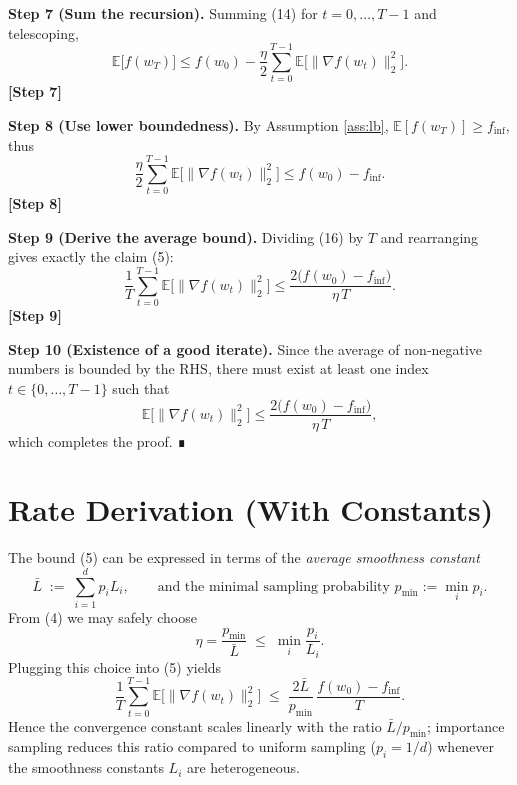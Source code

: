 \documentclass{article}
\newcommand{\EE}{\mathbb{E}}
\begin{document}
\noindent\textbf{Step 7 (Sum the recursion).}
Summing (14) for $t=0,\dots ,T-1$ and telescoping,
\[
\EE\!\bigl[f(w_T)\bigr]
\le f(w_0)-\frac{\eta}{2}\sum_{t=0}^{T-1}
\EE\!\bigl[\|\nabla f(w_t)\|_{2}^{2}\bigr].
\tag{15}
\]
\textbf{[Step 7]}

\noindent\textbf{Step 8 (Use lower boundedness).}
By Assumption \ref{ass:lb}, $\EE[f(w_T)]\ge f_{\inf}$, thus
\[
\frac{\eta}{2}\sum_{t=0}^{T-1}
\EE\!\bigl[\|\nabla f(w_t)\|_{2}^{2}\bigr]
\le f(w_0)-f_{\inf}.
\tag{16}
\]
\textbf{[Step 8]}

\noindent\textbf{Step 9 (Derive the average bound).}
Dividing (16) by $T$ and rearranging gives exactly the claim (5):
\[
\frac{1}{T}\sum_{t=0}^{T-1}
\EE\!\bigl[\|\nabla f(w_t)\|_{2}^{2}\bigr]
\le \frac{2\bigl(f(w_0)-f_{\inf}\bigr)}{\eta\,T}.
\tag{17}
\]
\textbf{[Step 9]}

\noindent\textbf{Step 10 (Existence of a good iterate).}
Since the average of non‑negative numbers is bounded by the RHS,
there must exist at least one index $t\in\{0,\dots ,T-1\}$ such that
\[
\EE\!\bigl[\|\nabla f(w_t)\|_{2}^{2}\bigr]
\le \frac{2\bigl(f(w_0)-f_{\inf}\bigr)}{\eta\,T},
\]
which completes the proof. ∎

\section*{Rate Derivation (With Constants)}
The bound (5) can be expressed in terms of the
\emph{average smoothness constant}
\[
\bar L\;:=\;\sum_{i=1}^{d}p_i L_i,
\qquad
\text{and the minimal sampling probability }p_{\min}:=\min_i p_i .
\]
From (4) we may safely choose
\[
\eta = \frac{p_{\min}}{\bar L}\; \le\; \min_i\frac{p_i}{L_i}.
\]
Plugging this choice into (5) yields
\[
\frac{1}{T}\sum_{t=0}^{T-1}
\EE\!\bigl[\|\nabla f(w_t)\|_{2}^{2}\bigr]
\;\le\;
\frac{2\bar L}{p_{\min}}\,
\frac{f(w_0)-f_{\inf}}{T}.
\tag{18}
\]
Hence the convergence constant scales linearly with the ratio
$\bar L/p_{\min}$; importance sampling reduces this ratio compared
to uniform sampling ($p_i=1/d$) whenever the smoothness constants $L_i$
are heterogeneous.

\end{document}
